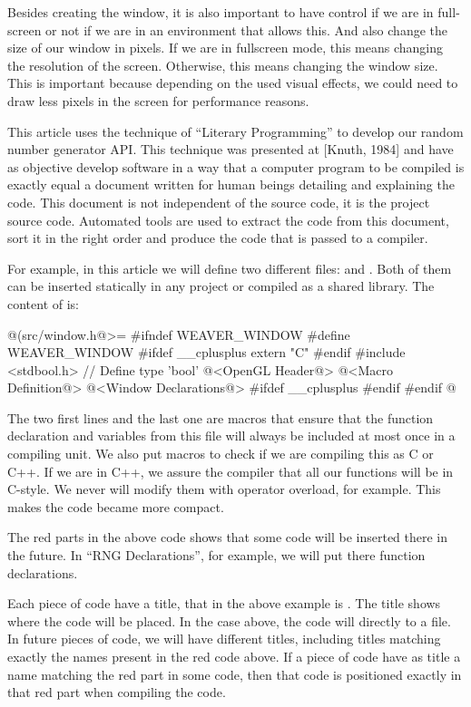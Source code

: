 Besides creating the window, it is also important to have control if
we are in full-screen or not if we are in an environment that allows
this. And also change the size of our window in pixels. If we are in
fullscreen mode, this means changing the resolution of the
screen. Otherwise, this means changing the window size. This is
important because depending on the used visual effects, we could need
to draw less pixels in the screen for performance reasons.


This article uses the technique of ``Literary Programming'' to develop
our random number generator API. This technique was presented at
[Knuth, 1984] and have as objective develop software in a way that a
computer program to be compiled is exactly equal a document written
for human beings detailing and explaining the code. This document is
not independent of the source code, it is the project source
code. Automated tools are used to extract the code from this document,
sort it in the right order and produce the code that is passed to a
compiler.

For example, in this article we will define two different
files:  and . Both of them
can be inserted statically in any project or compiled as a shared
library. The content of  is:

\iniciocodigo
@(src/window.h@>=
#ifndef WEAVER_WINDOW
#define WEAVER_WINDOW
#ifdef __cplusplus
extern "C" {
#endif
#include <stdbool.h> // Define type 'bool'
@<OpenGL Header@>
@<Macro Definition@>
@<Window Declarations@>
#ifdef __cplusplus
}
#endif
#endif
@
\fimcodigo

The two first lines and the last one are macros that ensure that the
function declaration and variables from this file will always be
included at most once in a compiling unit. We also put macros to check
if we are compiling this as C or C++. If we are in C++, we assure the
compiler that all our functions will be in C-style. We never will
modify them with operator overload, for example. This makes the code
became more compact.

The red parts in the above code shows that some code will be inserted
there in the future. In ``RNG Declarations'', for example, we will put
there function declarations.

Each piece of code have a title, that in the above example is
. The title shows where the code will be placed.
In the case above, the code will directly to a file. In future pieces
of code, we will have different titles, including titles matching
exactly the names present in the red code above. If a piece of code
have as title a name matching the red part in some code, then that
code is positioned exactly in that red part when compiling the code.


